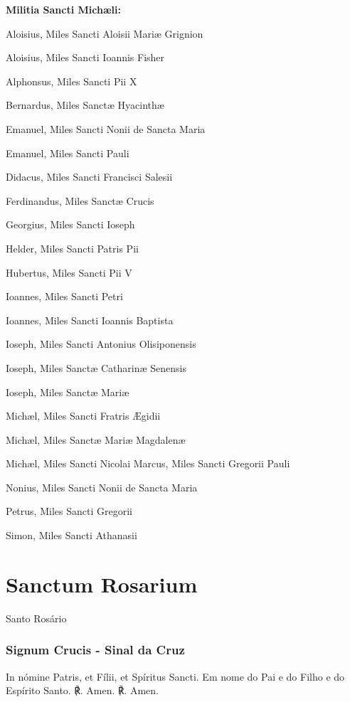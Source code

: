\textbf{Militia Sancti Michæli:}
\begin{paracol}{2}
\small{
Aloisius, Miles Sancti Aloisii Mariæ Grignion

Aloisius, Miles Sancti Ioannis Fisher

Alphonsus, Miles Sancti Pii X

Bernardus, Miles Sanctæ Hyacinthæ

Emanuel, Miles Sancti Nonii de Sancta Maria

Emanuel, Miles Sancti Pauli

Didacus, Miles Sancti Francisci Salesii

Ferdinandus, Miles Sanctæ Crucis

Georgius, Miles Sancti Ioseph

Helder, Miles Sancti Patris Pii

Hubertus, Miles Sancti Pii V

Ioannes, Miles Sancti Petri

Ioannes, Miles Sancti Ioannis Baptista

Ioseph, Miles Sancti Antonius Olisiponensis

Ioseph, Miles Sanctæ Catharinæ Senensis

Ioseph, Miles Sanctæ Mariæ

Michæl, Miles Sancti Fratris Ægidii

Michæl, Miles Sanctæ Mariæ Magdalenæ

Michæl, Miles Sancti Nicolai
\switchcolumn
Marcus, Miles Sancti Gregorii Pauli

Nonius, Miles Sancti Nonii de Sancta Maria

Petrus, Miles Sancti Gregorii

Simon, Miles Sancti Athanasii
}
\end{paracol}

\newpage

\section{Sanctum Rosarium}
\begin{nscenter}Santo Rosário\end{nscenter}

\emph{}

\subsubsection{Signum Crucis - Sinal da Cruz}
\begin{paracol}{2}
\cruz In nómine Patris, et Fílii, et Spíritus Sancti.
\switchcolumn
\cruz Em nome do Pai e do Filho e do Espírito Santo.
\switchcolumn*
℟. Amen.
\switchcolumn
℟. Amen.
\end{paracol}

